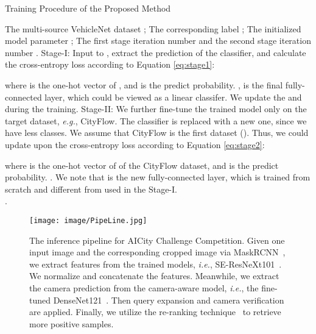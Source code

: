 \documentclass[journal]{IEEEtran}
\def\eg{\emph{e.g.}}
\def\ie{\emph{i.e.}}
\begin{document}
\begin{algorithm}[t]
\small
\caption{Training Procedure of the Proposed Method}
\label{alg:RECT}
\begin{algorithmic}[1]
\Require The multi-source VehicleNet dataset ; The corresponding label ; 
\Require The initialized model parameter ; The first stage iteration number  and the second stage iteration number .
\State Stage-I: Input  to , extract the prediction of the classifier, and calculate the cross-entropy loss according to Equation \ref{eq:stage1}:
\vspace{-1.5ex}

where  is the one-hot vector of , and  is the predict probability. ,  is the final fully-connected layer, which could be viewed as a linear classifer. We update the  and  during the training.
\EndFor 
{}
\State Stage-II: We further fine-tune the trained model only on the target dataset, \eg, CityFlow. The classifier is replaced with a new one, since we have less classes. We assume that CityFlow is the first dataset (). Thus, we could update  upon the cross-entropy loss according to Equation \ref{eq:stage2}:
\vspace{-1.5ex}

where  is the one-hot vector of  of the CityFlow dataset, and  is the predict probability. . We note that  is the new fully-connected layer, which is trained from scratch and different from  used in the Stage-I.
\EndFor \\
\Return .
\end{algorithmic}
\end{algorithm}

\begin{figure}[t]
\begin{center}
\texttt{[image: image/PipeLine.jpg]}
\end{center}
\vspace{-.2in}
   \caption{The inference pipeline for AICity Challenge Competition. Given one input image and the corresponding cropped image via MaskRCNN~\cite{He_2017_ICCV}, we extract features from the trained models, \ie, SE-ResNeXt101~\cite{hu2018senet}. We normalize and concatenate the features. Meanwhile, we extract the camera prediction from the camera-aware model, \ie, the fine-tuned DenseNet121~\cite{huang2017densely}. Then query expansion and camera verification are applied. Finally, we utilize the re-ranking technique~\cite{zhong2017re} to retrieve more positive samples. }
\label{fig:pip}
\vspace{-.2in}
\end{figure}
\end{document}

